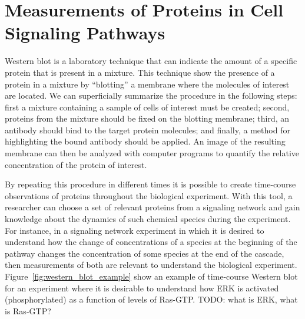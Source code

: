 \section{Measurements of Proteins in Cell Signaling Pathways}
Western blot is a laboratory technique that can indicate the amount of a
specific protein that is present in a mixture. This technique show the 
presence of a protein in a mixture by ``blotting'' a membrane where the 
molecules of interest are located. We can superficially summarize the 
procedure in the following steps: first a mixture containing a sample of 
cells of interest must be created; second, proteins from the mixture 
should be fixed on the blotting membrane; third, an antibody should bind 
to the target protein molecules; and finally, a method for highlighting 
the bound antibody should be applied. An image of the resulting membrane 
can then be analyzed with computer programs to quantify the relative 
concentration of the protein of interest.

By repeating this procedure in different times it is possible to create 
time-course observations of proteins throughout the biological 
experiment. With this tool, a researcher can choose a set of relevant 
proteins from a signaling network and gain knowledge about the dynamics 
of such chemical species during the experiment. For instance, in a 
signaling network experiment in which it is desired to understand how
the change of concentrations of a species at the beginning of the 
pathway changes the concentration of some species at the end of the 
cascade, then measurements of both are relevant to understand the 
biological experiment. Figure~\ref{fig:western_blot_example} show an 
example of time-course Western blot for an experiment where it is 
desirable to understand how ERK is activated (phosphorylated) as a 
function of levels of Ras-GTP. {\color{blue} TODO: what is ERK, what is
Ras-GTP?}

